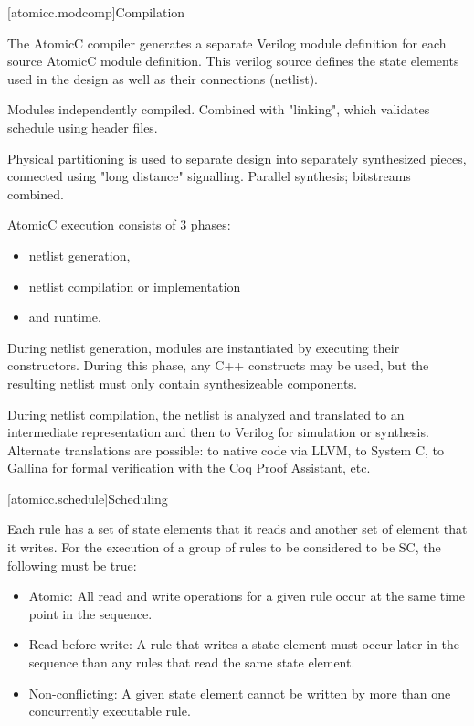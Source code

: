 [atomicc.modcomp]{Compilation}

The AtomicC compiler generates a separate Verilog module definition
for each source AtomicC module definition.
This verilog source defines the state elements
used in the design as well as their connections (netlist).

Modules independently compiled.  Combined with "linking", which validates schedule using header files.

Physical partitioning is used to separate design into separately synthesized pieces, connected using
"long distance" signalling.  Parallel synthesis; bitstreams combined.

AtomicC execution consists of 3 phases:
\begin{itemize}
\item netlist generation, 
\item netlist compilation or implementation
\item and runtime.
\end{itemize}

During netlist
generation, modules are instantiated by executing their
constructors. During this phase, any C++ constructs may be used, but
the resulting netlist must only contain synthesizeable components.

During netlist compilation, the netlist is analyzed and translated to
an intermediate representation and then to Verilog for simulation or
synthesis. Alternate translations are possible: to native code via
LLVM, to System C, to Gallina for formal verification with the Coq
Proof Assistant, etc.

[atomicc.schedule]{Scheduling}

Each rule has a set of state elements that it reads and another set of element that it writes.
For the execution of a group of rules to be considered to be SC, the following must
be true:

\begin{itemize}
\item Atomic: All read and write operations for a given rule occur at the same time point in the sequence.
\item Read-before-write:  A rule that writes a state element must occur later in the sequence
than any rules that read the same state element.
\item Non-conflicting: A given state element cannot be written by more than one concurrently executable rule.
\end{itemize}

